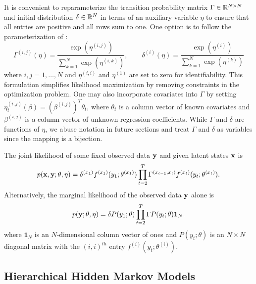 It is convenient to reparameterize the transition probability matrix $\Gamma \in \mathbb{R}^{N \times N}$ and initial distribution $\delta \in \mathbb{R}^N$ in terms of an auxiliary variable $\eta$ to ensure that all entries are positive and all rows sum to one. One option is to follow the parameterization of \citet{Barajas:2017}:
%
\begin{equation}
    \Gamma^{(i,j)}(\eta) = \frac{\exp(\eta^{(i,j)})}{\sum_{k=1}^N \exp(\eta^{(i,k)})}, \qquad \delta^{(i)}(\eta) = \frac{\exp(\eta^{(i)})}{\sum_{k=1}^N \exp(\eta^{(k)})}
    \label{eqn:reparam}
\end{equation}
%
where $i,j = 1,\ldots,N$ and $\eta^{(i,i)}$ and $\eta^{(1)}$ are set to zero for identifiability. This formulation simplifies likelihood maximization by removing constraints in the optimization problem. One may also incorporate covariates into $\Gamma$ by setting $\eta_t^{(i,j)}(\beta) = \left(\beta^{(i,j)}\right)^T \theta_t$, where $\theta_t$ is a column vector of known covariates and $\beta^{(i,j)}$ is a column vector of unknown regression coefficients. While $\Gamma$ and $\delta$ are functions of $\eta$, we abuse notation in future sections and treat $\Gamma$ and $\delta$ as variables since the mapping is a bijection.

The joint likelihood of some fixed observed data $\mathbf{y}$ and given latent states $\mathbf{x}$ is
%
\begin{equation}
    p(\mathbf{x},\mathbf{y};\theta,\eta) = \delta^{(x_1)} f^{(x_1)}(y_1; \theta^{(x_1)}) \prod_{t=2}^T \Gamma^{(x_{t-1},x_t)} f^{(x_t)}(y_t; \theta^{(x_t)}).
    \label{eqn:like}
\end{equation}
%
Alternatively, the marginal likelihood of the observed data $\mathbf{y}$ alone is 
%
\begin{equation}
    p(\mathbf{y};\theta,\eta) = \delta P(y_1;\theta) \prod_{t=2}^T \Gamma P(y_t;\theta) \mathbf{1}_N.
    \label{eqn:like_marginal}
\end{equation}
%
where $\mathbf{1}_N$ is an $N$-dimensional column vector of ones and $P(y_t;\theta)$ is an $N \times N$ diagonal matrix with the $(i,i)^{th}$ entry $f^{(i)}(y_t; \theta^{(i)})$.

\subsection{Hierarchical Hidden Markov Models}

